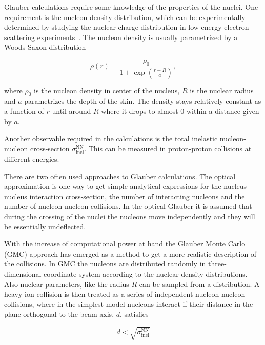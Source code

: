 Glauber calculations require some knowledge of the properties of the nuclei. One requirement is the nucleon density distribution, which can be experimentally determined by studying the nuclear charge distribution in low-energy electron scattering experiments~\cite{Miller:2007ri}.  The nucleon density is usually parametrized by a Woods-Saxon  distribution

%
\begin{equation}
\rho\left(r\right)=\frac{\rho_0}{1+\exp{\left(\frac{r-R}{a}\right)}}
,\end{equation}

\noindent where $\rho_0$ is the nucleon density in center of the nucleus, $R$ is the nuclear radius and $a$ parametrizes the depth of the skin. The density stays relatively constant as a function of $r$ until around $R$ where it drops to almost 0 within a distance given by $a$.

Another observable required in the calculations is the total inelastic nucleon-nucleon cross-section $\sigma\mathrm{^{NN}_{inel}}$.  This can be measured in proton-proton collisions at different energies.

There are two often used approaches to Glauber calculations. The optical approximation is one way to get simple analytical expressions for the nucleus-nucleus interaction cross-section, the number of interacting  nucleons and the number of nucleon-nucleon collisions. In the optical Glauber it is assumed that during the crossing of the nuclei the nucleons move independently and they will be essentially undeflected.  

With the increase of computational power at hand the Glauber Monte Carlo (GMC) approach has emerged as a method to get a more realistic description of the collisions. In GMC the nucleons are distributed randomly in three-dimensional coordinate system according to the nuclear density distributions. Also nuclear parameters, like the radius $R$ can be sampled from a distribution. A heavy-ion collision is then treated as a series of independent nucleon-nucleon collisions, where in the simplest model nucleons interact if their distance  in the plane orthogonal to the beam axis, $d$, satisfies

\begin{equation}
d< \sqrt{\sigma\mathrm{^{NN}_{inel}}}
\end{equation}

